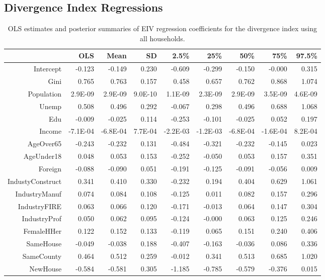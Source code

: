 \documentclass[12pt]{article}
\begin{document}
\clearpage

\subsection{Divergence Index Regressions}

\begin{table}[ht]
\centering
\begin{tabular}{rrrrrrrrr}
  \hline
 & OLS & Mean & SD & 2.5\% & 25\% & 50\% & 75\% & 97.5\% \\ 
  \hline
Intercept & -0.123 & -0.149 & 0.230 & -0.609 & -0.299 & -0.150 & -0.000 & 0.315 \\ 
  Gini & 0.765 & 0.763 & 0.157 & 0.458 & 0.657 & 0.762 & 0.868 & 1.074 \\ 
  Population & 2.9E-09 & 2.9E-09 & 9.0E-10 & 1.1E-09 & 2.3E-09 & 2.9E-09 & 3.5E-09 & 4.6E-09 \\ 
  Unemp & 0.508 & 0.496 & 0.292 & -0.067 & 0.298 & 0.496 & 0.688 & 1.068 \\ 
  Edu & -0.009 & -0.025 & 0.114 & -0.253 & -0.101 & -0.025 & 0.052 & 0.197 \\ 
  Income & -7.1E-04 & -6.8E-04 & 7.7E-04 & -2.2E-03 & -1.2E-03 & -6.8E-04 & -1.6E-04 & 8.2E-04 \\ 
  AgeOver65 & -0.243 & -0.232 & 0.131 & -0.484 & -0.321 & -0.232 & -0.145 & 0.023 \\ 
  AgeUnder18 & 0.048 & 0.053 & 0.153 & -0.252 & -0.050 & 0.053 & 0.157 & 0.351 \\ 
  Foreign & -0.088 & -0.090 & 0.051 & -0.191 & -0.125 & -0.091 & -0.056 & 0.009 \\ 
  IndustyConstruct & 0.341 & 0.410 & 0.330 & -0.232 & 0.194 & 0.404 & 0.629 & 1.061 \\ 
  IndustryManuf & 0.074 & 0.084 & 0.108 & -0.125 & 0.011 & 0.082 & 0.157 & 0.296 \\ 
  IndustryFIRE & 0.063 & 0.066 & 0.120 & -0.171 & -0.013 & 0.064 & 0.147 & 0.304 \\ 
  IndustryProf & 0.050 & 0.062 & 0.095 & -0.124 & -0.000 & 0.063 & 0.125 & 0.246 \\ 
  FemaleHHer & 0.122 & 0.152 & 0.133 & -0.119 & 0.065 & 0.151 & 0.240 & 0.406 \\ 
  SameHouse & -0.049 & -0.038 & 0.188 & -0.407 & -0.163 & -0.036 & 0.086 & 0.336 \\ 
  SameCounty & 0.464 & 0.512 & 0.259 & -0.012 & 0.341 & 0.513 & 0.685 & 1.020 \\ 
  NewHouse & -0.584 & -0.581 & 0.305 & -1.185 & -0.785 & -0.579 & -0.376 & 0.015 \\ 
   \hline
\end{tabular}
\caption{OLS estimates and posterior summaries of EIV regression coefficients for the divergence index using all households.}
\label{tab:eiv.kl.raw.all}
\end{table}
\end{document}
